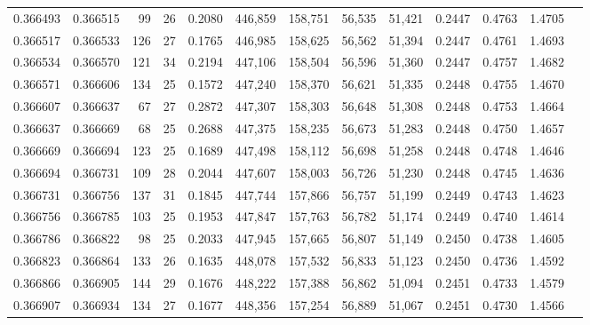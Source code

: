 \begin{tabular}{rrrrrrrrrrrrr}
0.366493 & 0.366515 &    99 &  26 &                                     0.2080 & 446,859 & 158,751 &  56,535 &  51,421 & 0.2447 & 0.4763 & 1.4705 \\
0.366517 & 0.366533 &   126 &  27 &                                     0.1765 & 446,985 & 158,625 &  56,562 &  51,394 & 0.2447 & 0.4761 & 1.4693 \\
0.366534 & 0.366570 &   121 &  34 &                                     0.2194 & 447,106 & 158,504 &  56,596 &  51,360 & 0.2447 & 0.4757 & 1.4682 \\
0.366571 & 0.366606 &   134 &  25 &                                     0.1572 & 447,240 & 158,370 &  56,621 &  51,335 & 0.2448 & 0.4755 & 1.4670 \\
0.366607 & 0.366637 &    67 &  27 &                                     0.2872 & 447,307 & 158,303 &  56,648 &  51,308 & 0.2448 & 0.4753 & 1.4664 \\
0.366637 & 0.366669 &    68 &  25 &                                     0.2688 & 447,375 & 158,235 &  56,673 &  51,283 & 0.2448 & 0.4750 & 1.4657 \\
0.366669 & 0.366694 &   123 &  25 &                                     0.1689 & 447,498 & 158,112 &  56,698 &  51,258 & 0.2448 & 0.4748 & 1.4646 \\
0.366694 & 0.366731 &   109 &  28 &                                     0.2044 & 447,607 & 158,003 &  56,726 &  51,230 & 0.2448 & 0.4745 & 1.4636 \\
0.366731 & 0.366756 &   137 &  31 &                                     0.1845 & 447,744 & 157,866 &  56,757 &  51,199 & 0.2449 & 0.4743 & 1.4623 \\
0.366756 & 0.366785 &   103 &  25 &                                     0.1953 & 447,847 & 157,763 &  56,782 &  51,174 & 0.2449 & 0.4740 & 1.4614 \\
0.366786 & 0.366822 &    98 &  25 &                                     0.2033 & 447,945 & 157,665 &  56,807 &  51,149 & 0.2450 & 0.4738 & 1.4605 \\
0.366823 & 0.366864 &   133 &  26 &                                     0.1635 & 448,078 & 157,532 &  56,833 &  51,123 & 0.2450 & 0.4736 & 1.4592 \\
0.366866 & 0.366905 &   144 &  29 &                                     0.1676 & 448,222 & 157,388 &  56,862 &  51,094 & 0.2451 & 0.4733 & 1.4579 \\
0.366907 & 0.366934 &   134 &  27 &                                     0.1677 & 448,356 & 157,254 &  56,889 &  51,067 & 0.2451 & 0.4730 & 1.4566 \\

\end{tabular}
